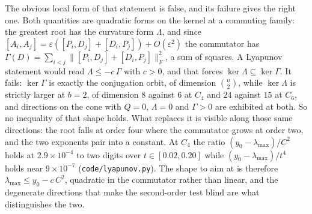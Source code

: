 \documentclass[11pt]{article}
\theoremstyle{remark}
\begin{document}
\begin{itemize}
  The obvious local form of that statement is false, and its failure gives the right one. Both
  quantities are quadratic forms on the kernel at a commuting family: the greatest root has the
  curvature form $\Lambda$, and since $[A_i,A_j]=\varepsilon([P_i,D_j]+[D_i,P_j])+O(\varepsilon^2)$
  the commutator has $\Gamma(D)=\sum_{i<j}\|[P_i,D_j]+[D_i,P_j]\|_F^2$, a sum of squares. A Lyapunov
  statement would read $\Lambda\le-c\,\Gamma$ with $c>0$, and that forces
  $\ker\Lambda\subseteq\ker\Gamma$. It fails: $\ker\Gamma$ is exactly the conjugation orbit, of
  dimension $\binom n2$, while $\ker\Lambda$ is strictly larger at $b=2$, of dimension $8$ against
  $6$ at $C_4$ and $24$ against $15$ at $C_6$, and directions on the cone with $Q=0$, $\Lambda=0$ and
  $\Gamma>0$ are exhibited at both. So no inequality of that shape holds.
  What replaces it is visible along those same directions: the root falls at order four where the
  commutator grows at order two, and the two exponents pair into a constant. At $C_4$ the ratio
  $(y_0-\lambda_{\max})/C^2$ holds at $2.9\times10^{-4}$ to two digits over
  $t\in[0.02,0.20]$ while $(y_0-\lambda_{\max})/t^4$ holds near $9\times10^{-7}$
  (\texttt{code/lyapunov.py}). The shape to aim at is therefore
  $\lambda_{\max}\le y_0-c\,C^2$, quadratic in the commutator rather than linear, and the degenerate
  directions that make the second-order test blind are what distinguishes the two.


\end{itemize}
\end{document}
